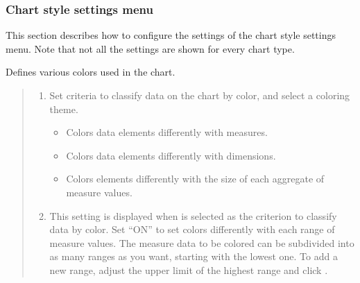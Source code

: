 \documentclass[letterpaper,10pt,english]{sphinxmanual}
\begin{document}
\subsubsection{Chart style settings menu}
\label{\detokenize{discovery/part04/chart_style:id2}}
This section describes how to configure the settings of the chart style settings menu. Note that not all the settings are shown for every chart type.


Defines various colors used in the chart.
\begin{quote}

\begin{figure}[H]
\centering

\noindent{}
\end{figure}
\begin{enumerate}
\def\theenumi{\arabic{enumi}}
\def\labelenumi{\theenumi .}
\makeatletter\def\p@enumii{\p@enumi \theenumi .}\makeatother
\item {} 
 Set criteria to classify data on the chart by color, and select a coloring theme.
\begin{itemize}
\item {} 
 Colors data elements differently with measures.

\item {} 
 Colors data elements differently with dimensions.

\item {} 
 Colors elements differently with the size of each aggregate of measure values.

\end{itemize}

\item {} 
 This setting is displayed when  is selected as the criterion to classify data by color. Set “ON” to set colors differently with each range of measure values. The measure data to be colored can be subdivided into as many ranges as you want, starting with the lowest one. To add a new range, adjust the upper limit of the highest range and click .

\end{enumerate}
\end{quote}
\end{document}
